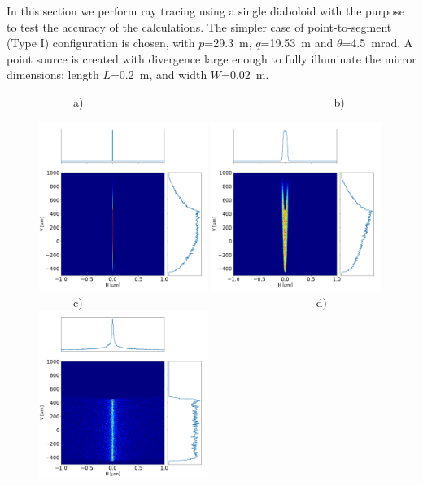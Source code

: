 \documentclass{iucr}              %
\begin{document}
In this section we perform ray tracing using a single diaboloid with the purpose to test the accuracy of the calculations. The simpler case of point-to-segment (Type I) configuration is chosen, with $p$=29.3~m, $q$=19.53~m and $\theta$=4.5~mrad. A point source is created with divergence large enough to fully illuminate the mirror dimensions: 
length $L$=0.2~m, and width $W$=0.02~m.

\begin{figure}\label{fig:pointToSegment}
\flushleft
~~~~~~a)~~~~~~~~~~~~~~~~~~~~~~~~~~~~~~~~~~~~~~~~~~~~b)\\
\centering

\includegraphics[width=0.49\textwidth]{figures/p2s_V_z.png}
\includegraphics[width=0.49\textwidth]{figures/p2s_K_z.png} \\
\flushleft
~~~~~~c)~~~~~~~~~~~~~~~~~~~~~~~~~~~~~~~~~~~~~~~~~d)\\
\includegraphics[width=0.49\textwidth]{figures/p2s_parabolic-cone_z.png}

\end{figure}
\end{document}
